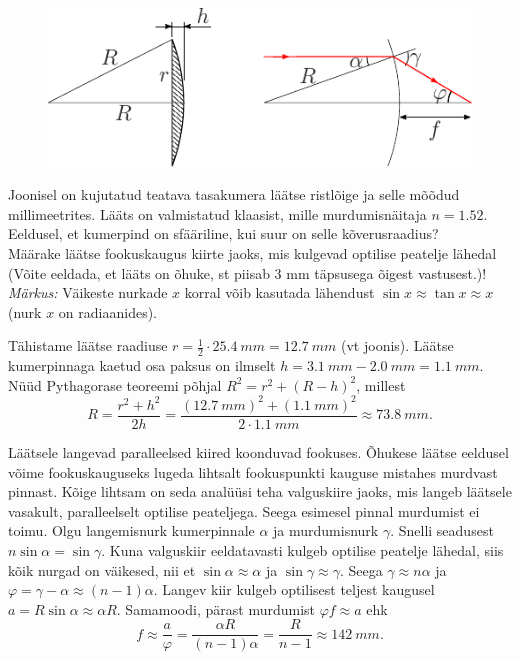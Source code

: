 
\begin{figure}
    \vspace{-30pt}
    \begin{center}
        \includegraphics[width=\linewidth]{2023-lahg-08-yl.pdf}
    \end{center}
\end{figure}
Joonisel on kujutatud teatava tasakumera läätse ristlõige ja selle mõõdud millimeetrites. Lääts on valmistatud klaasist, mille murdumisnäitaja $n=\num{1.52}$.\\
\osa Eeldusel, et kumerpind on sfääriline, kui suur on selle kõverusraadius?\\
\osa Määrake läätse fookuskaugus kiirte jaoks, mis kulgevad optilise peatelje lähedal (Võite eeldada, et lääts on õhuke, st piisab 3 mm täpsusega õigest vastusest.)! \\ \emph{Märkus:} Väikeste nurkade $x$ korral võib kasutada lähendust $\sin{x} \approx \tan{x} \approx x$ (nurk $x$ on radiaanides).



\hint

\solu
\osa Tähistame läätse raadiuse $r=\frac{1}{2}\cdot \SI{25.4}{mm}=\SI{12.7}{mm}$ (vt joonis). Läätse kumerpinnaga kaetud osa paksus on ilmselt $h = \SI{3.1}{mm} - \SI{2.0}{mm} = \SI{1.1}{mm}$. Nüüd Pythagorase teoreemi põhjal $R^2 = r^2 + (R - h)^2$, millest
\[
R = \frac{r^2 + h^2}{2h} = \frac{(\SI{12.7}{mm})^2 + (\SI{1.1}{mm})^2}{2\cdot \SI{1.1}{mm}}\approx \SI{73.8}{mm}.
\]

\osa Läätsele langevad paralleelsed kiired koonduvad fookuses. Õhukese läätse eeldusel võime fookuskauguseks lugeda lihtsalt fookuspunkti kauguse mistahes murdvast pinnast. Kõige lihtsam on seda analüüsi teha valguskiire jaoks, mis langeb läätsele vasakult, paralleelselt optilise peateljega. Seega esimesel pinnal murdumist ei toimu. Olgu langemisnurk kumerpinnale $\alpha$ ja murdumisnurk $\gamma$. Snelli seadusest $n\sin\alpha=\sin\gamma$. Kuna valguskiir eeldatavasti kulgeb optilise peatelje lähedal, siis kõik nurgad on väikesed, nii et $\sin\alpha\approx\alpha$ ja $\sin\gamma\approx\gamma$. Seega $\gamma\approx n\alpha$ ja $\varphi=\gamma-\alpha\approx(n-1)\alpha$. Langev kiir kulgeb optilisest teljest kaugusel $a=R\sin\alpha\approx \alpha R$. Samamoodi, pärast murdumist $\varphi f\approx a$ ehk
\[
f\approx\frac{a}{\varphi}=\frac{\alpha R}{(n-1)\alpha}=\frac{R}{n-1}\approx \SI{142}{mm}.
\]

